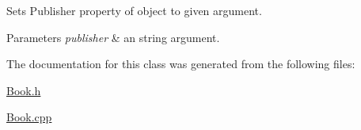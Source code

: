 \begin{DoxyItemize}
\item Sets Publisher property of object to given argument.
\end{DoxyItemize}


\begin{DoxyParams}{Parameters}
{\em publisher} & an string argument. \\
\hline
\end{DoxyParams}


The documentation for this class was generated from the following files\+:\begin{DoxyCompactItemize}
\item 
\hyperlink{Book_8h}{Book.\+h}\item 
\hyperlink{Book_8cpp}{Book.\+cpp}\end{DoxyCompactItemize}
